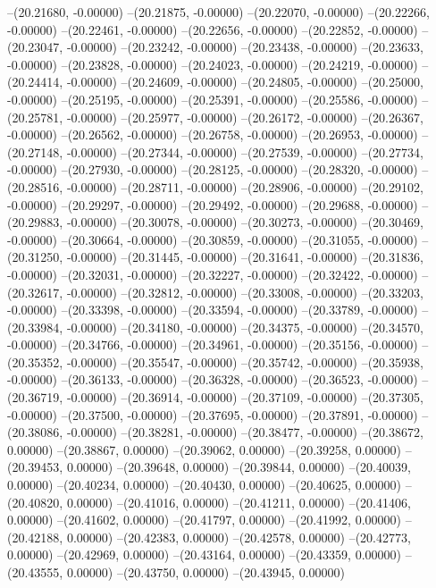 --(20.21680, -0.00000)
--(20.21875, -0.00000)
--(20.22070, -0.00000)
--(20.22266, -0.00000)
--(20.22461, -0.00000)
--(20.22656, -0.00000)
--(20.22852, -0.00000)
--(20.23047, -0.00000)
--(20.23242, -0.00000)
--(20.23438, -0.00000)
--(20.23633, -0.00000)
--(20.23828, -0.00000)
--(20.24023, -0.00000)
--(20.24219, -0.00000)
--(20.24414, -0.00000)
--(20.24609, -0.00000)
--(20.24805, -0.00000)
--(20.25000, -0.00000)
--(20.25195, -0.00000)
--(20.25391, -0.00000)
--(20.25586, -0.00000)
--(20.25781, -0.00000)
--(20.25977, -0.00000)
--(20.26172, -0.00000)
--(20.26367, -0.00000)
--(20.26562, -0.00000)
--(20.26758, -0.00000)
--(20.26953, -0.00000)
--(20.27148, -0.00000)
--(20.27344, -0.00000)
--(20.27539, -0.00000)
--(20.27734, -0.00000)
--(20.27930, -0.00000)
--(20.28125, -0.00000)
--(20.28320, -0.00000)
--(20.28516, -0.00000)
--(20.28711, -0.00000)
--(20.28906, -0.00000)
--(20.29102, -0.00000)
--(20.29297, -0.00000)
--(20.29492, -0.00000)
--(20.29688, -0.00000)
--(20.29883, -0.00000)
--(20.30078, -0.00000)
--(20.30273, -0.00000)
--(20.30469, -0.00000)
--(20.30664, -0.00000)
--(20.30859, -0.00000)
--(20.31055, -0.00000)
--(20.31250, -0.00000)
--(20.31445, -0.00000)
--(20.31641, -0.00000)
--(20.31836, -0.00000)
--(20.32031, -0.00000)
--(20.32227, -0.00000)
--(20.32422, -0.00000)
--(20.32617, -0.00000)
--(20.32812, -0.00000)
--(20.33008, -0.00000)
--(20.33203, -0.00000)
--(20.33398, -0.00000)
--(20.33594, -0.00000)
--(20.33789, -0.00000)
--(20.33984, -0.00000)
--(20.34180, -0.00000)
--(20.34375, -0.00000)
--(20.34570, -0.00000)
--(20.34766, -0.00000)
--(20.34961, -0.00000)
--(20.35156, -0.00000)
--(20.35352, -0.00000)
--(20.35547, -0.00000)
--(20.35742, -0.00000)
--(20.35938, -0.00000)
--(20.36133, -0.00000)
--(20.36328, -0.00000)
--(20.36523, -0.00000)
--(20.36719, -0.00000)
--(20.36914, -0.00000)
--(20.37109, -0.00000)
--(20.37305, -0.00000)
--(20.37500, -0.00000)
--(20.37695, -0.00000)
--(20.37891, -0.00000)
--(20.38086, -0.00000)
--(20.38281, -0.00000)
--(20.38477, -0.00000)
--(20.38672, 0.00000)
--(20.38867, 0.00000)
--(20.39062, 0.00000)
--(20.39258, 0.00000)
--(20.39453, 0.00000)
--(20.39648, 0.00000)
--(20.39844, 0.00000)
--(20.40039, 0.00000)
--(20.40234, 0.00000)
--(20.40430, 0.00000)
--(20.40625, 0.00000)
--(20.40820, 0.00000)
--(20.41016, 0.00000)
--(20.41211, 0.00000)
--(20.41406, 0.00000)
--(20.41602, 0.00000)
--(20.41797, 0.00000)
--(20.41992, 0.00000)
--(20.42188, 0.00000)
--(20.42383, 0.00000)
--(20.42578, 0.00000)
--(20.42773, 0.00000)
--(20.42969, 0.00000)
--(20.43164, 0.00000)
--(20.43359, 0.00000)
--(20.43555, 0.00000)
--(20.43750, 0.00000)
--(20.43945, 0.00000)
